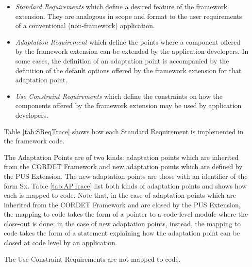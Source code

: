\documentclass{pnp_article}
\begin{document}
\begin{itemize}
\item{} \textit{Standard Requirements} which define a desired feature of the framework extension. They are analogous in scope and format to the user requirements of a conventional (non-framework) application.
\item{} \textit{Adaptation Requirement} which define the points where a component offered by the framework extension can be extended by the application developers. In some cases, the definition of an adaptation point is accompanied by the definition of the default options offered by the framework extension for that adaptation point.  
\item{} \textit{Use Constraint Requirements} which define the constraints on how the components offered by the framework extension may be used by application developers.
\end{itemize}

Table \ref{tab:SReqTrace} shows how each Standard Requirement is implemented in the framework code. 

The Adaptation Points are of two kinds: adaptation points which are inherited from the CORDET Framework and new adaptation points which are defined by the PUS Extension. The new adaptation points are those with an identifier of the form Sx. Table \ref{tab:APTrace} list both kinds of adaptation points and shows how each is mapped to code. Note that, in the case of adaptation points which are inherited from the CORDET Framework and are closed by the PUS Extension, the mapping to code takes the form of a pointer to a code-level module where the close-out is done; in the case of new adaptation points, instead, the mapping to code takes the form of a statement explaining how the adaptation point can be closed at code level by an application.

The Use Constraint Requirements are not mapped to code. 


\begin{landscape}

\newpage
{}


\end{landscape}
\end{document}
